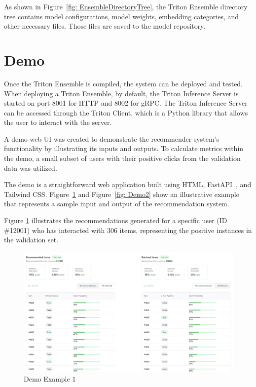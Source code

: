As shown in Figure~\ref{fig: EnsembleDirectoryTree}, the Triton Ensemble directory tree contains model configurations, model weights, embedding categories, and other necessary files.
Those files are saved to the model repository.

\section{Demo}

Once the Triton Ensemble is compiled, the system can be deployed and tested.
When deploying a Triton Ensemble, by default, the Triton Inference Server is started on port 8001 for HTTP and 8002 for gRPC.
The Triton Inference Server can be accessed through the Triton Client, which is a Python library that allows the user to interact with the server.

A demo web UI was created to demonstrate the recommender system's functionality by illustrating its inputs and outputs.
To calculate metrics within the demo, a small subset of users with their positive clicks from the validation data was utilized.

The demo is a straightforward web application built using HTML, FastAPI~\cite{FastAPI}, and Tailwind CSS.
Figure~\ref{fig: Demo1} and Figure~\ref{fig: Demo2} show an illustrative example that represents a sample input and output of the recommendation system.

Figure \ref{fig: Demo1} illustrates the recommendations generated for a specific user (ID \#12001) who has interacted with 306 items, representing the positive instances in the validation set.


\begin{figure}[H]
    \centering
    \includegraphics[width=\textwidth]{assets/demo_1.jpeg}
    \caption{Demo Example 1}
    \label{fig: Demo1}
\end{figure}

